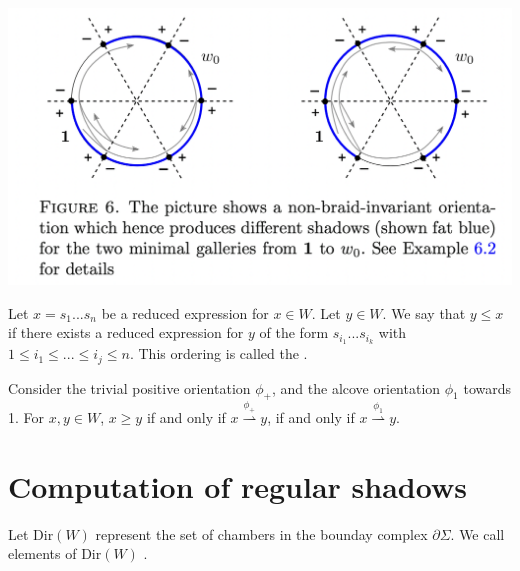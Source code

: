 \documentclass[11pt]{article}
\begin{document}
\includegraphics[scale=0.6]{Screenshot 2023-02-08 at 10.39.18.png}\\


\begin{definition}
    Let $x=s_1...s_n$ be a reduced expression for $x\in W$. Let $y\in W$. We say that $y\leq x$ if there exists a reduced expression for $y$ of the form $s_{i_1}...s_{i_k}$ with $1\leq i_1\leq...\leq i_j\leq n$. This ordering is called the .
\end{definition}

\begin{proposition}
    Consider the trivial positive orientation $\phi_+$, and the alcove orientation $\phi_1$ towards 1. For $x,y\in W$, $x\geq y$ if and only if $x\stackrel{\phi_+}{\rightharpoonup} y$, if and only if $x\stackrel{\phi_1}{\rightharpoonup} y$.
\end{proposition}


\section{Computation of regular shadows}

Let Dir$(W)$ represent the set of chambers in the bounday complex $\partial\Sigma$. We call elements of Dir$(W)$ . 
\end{document}

